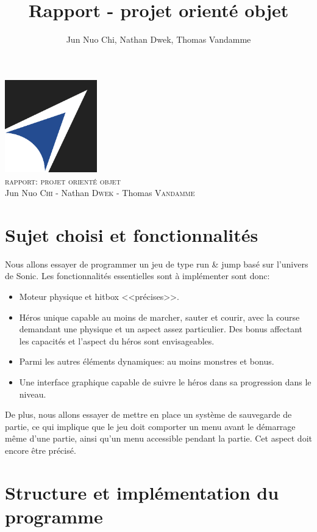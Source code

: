 \documentclass[a4paper, 12pt]{article}
\title{Rapport - projet orienté objet}
\author{Jun Nuo Chi, Nathan Dwek, Thomas Vandamme}
\begin{document}
\begin{center}
  \includegraphics[width=0.3\textwidth]{EPB.jpg}~\\[.5cm]

\textsc{\Large rapport: projet orienté objet}\\
Jun Nuo \textsc{Chi} - Nathan \textsc{Dwek} - Thomas \textsc{Vandamme}
\end{center}

\section{Sujet choisi et fonctionnalités}

Nous allons essayer de programmer un jeu de type run \& jump basé sur l'univers de Sonic. Les fonctionnalités essentielles sont à implémenter sont donc:
\begin{itemize}

\item Moteur physique et hitbox <<précises>>.
\item Héros unique capable au moins de marcher, sauter et courir, avec la course demandant une physique et un aspect assez particulier. Des bonus affectant les capacités et l'aspect du héros sont envisageables.
\item Parmi les autres éléments dynamiques: au moins monstres et bonus.
\item Une interface graphique capable de suivre le héros dans sa progression dans le niveau.

\end{itemize}

De plus, nous allons essayer de mettre en place un système de sauvegarde de partie, ce qui implique que le jeu doit comporter un menu avant le démarrage même d'une partie, ainsi qu'un menu accessible pendant la partie. Cet aspect doit encore être précisé.

\section{Structure et implémentation du programme}
\end{document}
